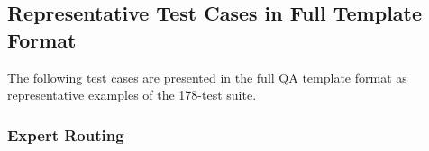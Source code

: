 \documentclass{FastFyp}
\begin{document}
\subsection{Representative Test Cases in Full Template Format}
The following test cases are presented in the full QA template format as representative examples of the 178-test suite.

\FloatBarrier
\subsubsection{Expert Routing}
\providecommand{\tcW}{\dimexpr\textwidth-8\tabcolsep-5\arrayrulewidth\relax}
\providecommand{\tcA}{\dimexpr\tcW*21/100\relax}
\providecommand{\tcB}{\dimexpr\tcW*23/100\relax}
\providecommand{\tcC}{\dimexpr\tcW*20/100\relax}
\providecommand{\tcD}{\dimexpr\tcW*36/100\relax}
\providecommand{\tcSpanBC}{\dimexpr\tcB+\tcC+2\tabcolsep+\arrayrulewidth\relax}
\providecommand{\tcSpanBCD}{\dimexpr\tcB+\tcC+\tcD+4\tabcolsep+2\arrayrulewidth\relax}
\providecommand{\tcSpanAll}{\dimexpr\tcA+\tcB+\tcC+\tcD+6\tabcolsep+3\arrayrulewidth\relax}
\end{document}
